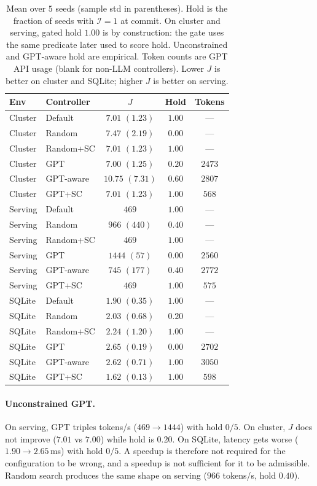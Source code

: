 \documentclass{article}
\begin{document}
\begin{table}[ht]
\caption{Mean over $5$ seeds (sample std in parentheses). Hold is the fraction of seeds with $\mathcal{I}{=}1$ at commit.
On cluster and serving, gated hold $1.00$ is by construction: the gate uses the same predicate later used to score hold.
Unconstrained and GPT-aware hold are empirical.
Token counts are GPT API usage (blank for non-LLM controllers).
Lower $J$ is better on cluster and SQLite; higher $J$ is better on serving.}
\label{tab:main}
\centering
\scriptsize
\setlength{\tabcolsep}{2.4pt}
\begin{tabular}{llccc}
\toprule
Env & Controller & $J$ & Hold & Tokens \\
\midrule
Cluster & Default & $7.01$ $(1.23)$ & $1.00$ & --- \\
Cluster & Random & $7.47$ $(2.19)$ & $0.00$ & --- \\
Cluster & Random+SC & $7.01$ $(1.23)$ & $1.00$ & --- \\
Cluster & GPT & $7.00$ $(1.25)$ & $0.20$ & $2473$ \\
Cluster & GPT-aware & $10.75$ $(7.31)$ & $0.60$ & $2807$ \\
Cluster & GPT+SC & $7.01$ $(1.23)$ & $1.00$ & $568$ \\
\midrule
Serving & Default & $469$ & $1.00$ & --- \\
Serving & Random & $966$ $(440)$ & $0.40$ & --- \\
Serving & Random+SC & $469$ & $1.00$ & --- \\
Serving & GPT & $1444$ $(57)$ & $0.00$ & $2560$ \\
Serving & GPT-aware & $745$ $(177)$ & $0.40$ & $2772$ \\
Serving & GPT+SC & $469$ & $1.00$ & $575$ \\
\midrule
SQLite & Default & $1.90$ $(0.35)$ & $1.00$ & --- \\
SQLite & Random & $2.03$ $(0.68)$ & $0.20$ & --- \\
SQLite & Random+SC & $2.24$ $(1.20)$ & $1.00$ & --- \\
SQLite & GPT & $2.65$ $(0.19)$ & $0.00$ & $2702$ \\
SQLite & GPT-aware & $2.62$ $(0.71)$ & $1.00$ & $3050$ \\
SQLite & GPT+SC & $1.62$ $(0.13)$ & $1.00$ & $598$ \\
\bottomrule
\end{tabular}
\end{table}

\paragraph{Unconstrained GPT.}
On serving, GPT triples tokens/s ($469\to 1444$) with hold $0/5$.
On cluster, $J$ does not improve ($7.01$ vs $7.00$) while hold is $0.20$.
On SQLite, latency gets worse ($1.90\to 2.65$\,ms) with hold $0/5$.
A speedup is therefore not required for the configuration to be wrong, and a speedup is not sufficient for it to be admissible.
Random search produces the same shape on serving ($966$ tokens/s, hold $0.40$).
\end{document}

